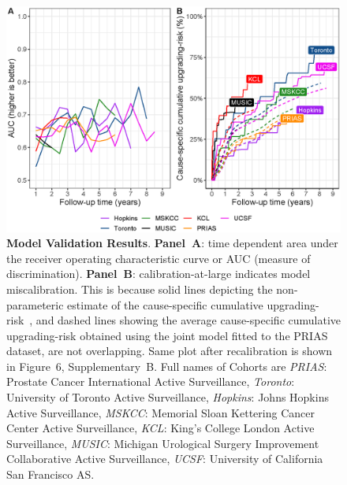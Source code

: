 \begin{figure}
\centerline{\includegraphics[width=\columnwidth]{images/auc_beforecalib.eps}}
\caption{\textbf{Model Validation Results}. \textbf{Panel~A}: time dependent area under the receiver operating characteristic curve or AUC (measure of discrimination). \textbf{Panel~B}: calibration-at-large indicates model miscalibration. This is because solid lines depicting the non-parameteric estimate of the cause-specific cumulative upgrading-risk~\citep{turnbull1976empirical}, and dashed lines showing the average cause-specific cumulative upgrading-risk obtained using the joint model fitted to the PRIAS dataset, are not overlapping. Same plot after recalibration is shown in Figure~6, Supplementary~B. Full names of Cohorts are \textit{PRIAS}: Prostate Cancer International Active Surveillance, \textit{Toronto}: University of Toronto Active Surveillance, \textit{Hopkins}: Johns Hopkins Active Surveillance, \textit{MSKCC}: Memorial Sloan Kettering Cancer Center Active Surveillance, \textit{KCL}: King's College London Active Surveillance, \textit{MUSIC}: Michigan Urological Surgery Improvement Collaborative Active Surveillance, \textit{UCSF}: University of California San Francisco AS.}
\label{fig:auc_beforecalib}
\end{figure}

